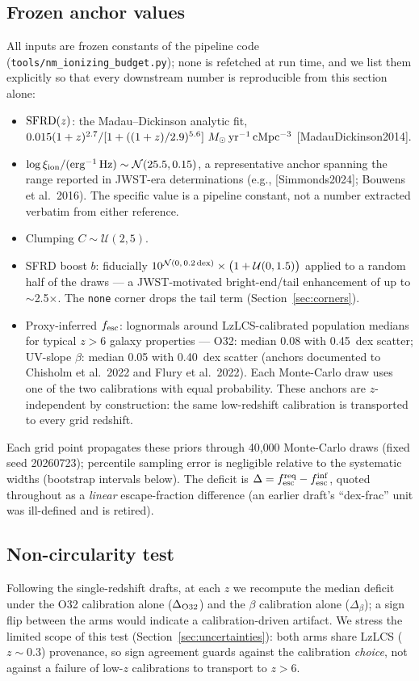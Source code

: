 \documentclass[twocolumn]{aastex702}
\begin{document}
\subsection{Frozen anchor values}
\label{sec:anchors}
All inputs are frozen constants of the pipeline code (\texttt{tools/nm\_ionizing\_budget.py}); none is refetched at run time, and we list them explicitly so that every downstream number is reproducible from this section alone:
\begin{itemize}
\item ${\rm SFRD}(z)$: the Madau--Dickinson analytic fit, $0.015(1+z)^{2.7}/[1+((1+z)/2.9)^{5.6}]\ M_\odot\,{\rm yr^{-1}\,cMpc^{-3}}$ [MadauDickinson2014].
\item $\log \xi_{\rm ion}/({\rm erg^{-1}\,Hz}) \sim \mathcal{N}(25.5, 0.15)$, a representative anchor spanning the range reported in JWST-era determinations (e.g., [Simmonds2024]; Bouwens et al.\ 2016). The specific value is a pipeline constant, not a number extracted verbatim from either reference.
\item Clumping $C \sim \mathcal{U}(2,5)$.
\item SFRD boost $b$: fiducially $10^{\mathcal{N}(0,\,0.2\,{\rm dex})}\times\big(1+\mathcal{U}(0,1.5)\big)$ applied to a random half of the draws --- a JWST-motivated bright-end/tail enhancement of up to $\sim$2.5$\times$. The \texttt{none} corner drops the tail term (Section~\ref{sec:corners}).
\item Proxy-inferred $f_{\rm esc}$: lognormals around LzLCS-calibrated population medians for typical $z>6$ galaxy properties --- O32: median 0.08 with 0.45~dex scatter; UV-slope $\beta$: median 0.05 with 0.40~dex scatter (anchors documented to Chisholm et al.\ 2022 and Flury et al.\ 2022). Each Monte-Carlo draw uses one of the two calibrations with equal probability. These anchors are $z$-independent by construction: the same low-redshift calibration is transported to every grid redshift.
\end{itemize}
Each grid point propagates these priors through 40{,}000 Monte-Carlo draws (fixed seed 20260723); percentile sampling error is negligible relative to the systematic widths (bootstrap intervals below). The deficit is $\Delta = f_{\rm esc}^{\rm req} - f_{\rm esc}^{\rm inf}$, quoted throughout as a \emph{linear} escape-fraction difference (an earlier draft's ``dex-frac'' unit was ill-defined and is retired).

\subsection{Non-circularity test}
Following the single-redshift drafts, at each $z$ we recompute the median deficit under the O32 calibration alone ($\Delta_{\rm O32}$) and the $\beta$ calibration alone ($\Delta_\beta$); a sign flip between the arms would indicate a calibration-driven artifact. We stress the limited scope of this test (Section~\ref{sec:uncertainties}): both arms share LzLCS ($z\sim0.3$) provenance, so sign agreement guards against the calibration \emph{choice}, not against a failure of low-$z$ calibrations to transport to $z>6$.
\end{document}

